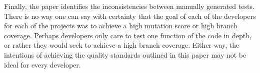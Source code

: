 Finally, the paper identifies the inconsistencies between manually generated tests. There is no way one can say with certainty that the goal of each of the developers for each of the projects was to achieve a high mutation score or high branch coverage. Perhaps developers only care to test one function of the code in depth, or rather they would seek to achieve a high branch coverage. Either way, the intentions of achieving the quality standards outlined in this paper may not be ideal for every developer. 


